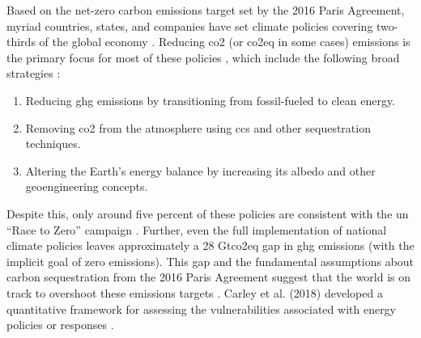 Based on the net-zero carbon emissions target set by the 2016 Paris Agreement,
myriad countries, states, and companies have set climate policies covering
two-thirds of the global economy \cite{hale_assessing_2022}. Reducing \ac{co2}
(or \ac{co2eq} in some cases) emissions is the primary focus for most of these
policies \cite{fawzy_strategies_2020, roelfsema_taking_2020,
hale_assessing_2022}, which include the following broad strategies
\cite{fawzy_strategies_2020}:
\begin{enumerate}
    \item Reducing \ac{ghg} emissions by transitioning from fossil-fueled to
    clean energy.
    \item Removing \ac{co2} from the atmosphere using \ac{ccs} and other
    sequestration techniques.
    \item Altering the Earth's energy balance by increasing its albedo and other
    geoengineering concepts.
\end{enumerate}
Despite this, only around five percent of these policies are consistent with the
\ac{un} ``Race to Zero'' campaign \cite{hale_assessing_2022}. Further, even the
full implementation of national climate policies leaves approximately  a 28
Gt\ac{co2eq} gap in \ac{ghg} emissions \cite{roelfsema_taking_2020} (with the
implicit goal of zero emissions). This gap and the fundamental assumptions about
carbon sequestration from the 2016 Paris Agreement suggest that the world is on
track to overshoot these emissions targets
\cite{roelfsema_taking_2020,taylor_managing_2021}. Carley et al. (2018)
developed a quantitative framework for assessing the vulnerabilities associated
with energy policies or responses \cite{carley_framework_2018}.


